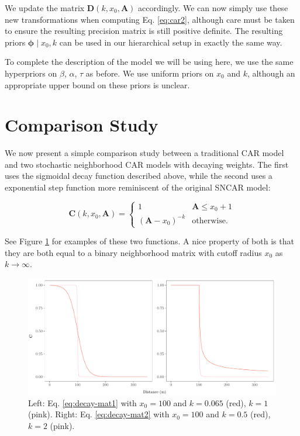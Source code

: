 \documentclass{scrartcl}
\newcommand{\todo}[1]{\textcolor{red}{TODO:
    #1}\PackageWarning{TODO:}{#1!}}
\newcommand{\mat}[1]{\bm{#1}}
\begin{document}
We update the matrix $\mat{D}(k, x_0, \mat{A})$ accordingly. We can
now simply use these new transformations when computing
Eq. \eqref{eq:car2}, although care must be taken to ensure the
resulting precision matrix is still positive definite. The resulting
priors $\mat{\phi} \mid x_0, k$ can be used in our hierarchical setup
in exactly the same way.

To complete the description of the model we will be using here, we use
the same hyperpriors on $\beta$, $\alpha$, $\tau$ as before. We use
uniform priors on $x_0$ and $k$, although an appropriate upper bound
on these priors is unclear. %



\section{Comparison Study}
\label{sec:simulation-study}

We now present a simple comparison study between a traditional CAR
model and two stochastic neighborhood CAR models with decaying
weights. The first uses the sigmoidal decay function described above,
while the second uses a exponential step function more reminiscent of
the original SNCAR model:

\begin{equation}
  \label{eq:decay-mat2}
  \mat{C}(k, x_0, \mat{A}) =
  \begin{cases}
    1 & \mat{A} \leq x_0 + 1\\
    (\mat{A} - x_0)^{-k} & \text{otherwise.}
  \end{cases}
\end{equation}

See Figure \ref{fig:fig1} for examples of these two functions. A nice
property of both is that they are both equal to a binary neighborhood
matrix with cutoff radius $x_0$ as $k \rightarrow\infty$.

\begin{figure}
  \centering
  \includegraphics[width=.75\linewidth]{fig1}
  \caption{Left: Eq. \eqref{eq:decay-mat1} with $x_0 = 100$ and
    $k = 0.065$ (red), $k = 1$ (pink). Right:
    Eq. \eqref{eq:decay-mat2} with $x_0 = 100$ and $k = 0.5$ (red),
    $k = 2$ (pink).}
  \label{fig:fig1}
\end{figure}
\end{document}
